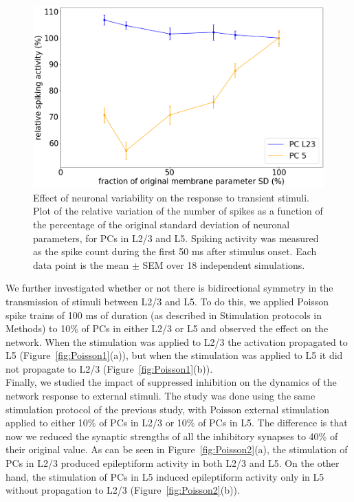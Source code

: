 \begin{figure}[H]
    \centering
    \includegraphics[scale=0.25]{Variab5.png}
    \caption{Effect of neuronal variability on the response to transient stimuli. Plot of the relative variation of the number of spikes as a function of the percentage of the original standard deviation of neuronal parameters, for PCs in L2/3 and L5. Spiking activity was measured as the spike count during the first 50 ms after stimulus onset. Each data point is the mean $\pm$ SEM over 18 independent simulations.}
    \label{fig:variab}
\end{figure}

We further investigated whether or not there is bidirectional symmetry in the transmission of stimuli between L2/3 and L5. To do this, we applied Poisson spike trains of 100 ms of duration (as described in Stimulation protocols in Methods) to 10\% of PCs in either L2/3 or L5 and observed the effect on the network. When the stimulation was applied to L2/3 the activation propagated to L5 (Figure~\ref{fig:Poisson1}(a)), but when the stimulation was applied to L5 it did not propagate to L2/3 (Figure~\ref{fig:Poisson1}(b)).\\  

Finally, we studied the impact of suppressed inhibition on the dynamics of the network response to external stimuli. The study was done using the same stimulation protocol of the previous study, with Poisson external stimulation applied to either 10\% of PCs in L2/3 or 10\% of PCs in L5. The difference is that now we reduced the synaptic strengths of all the inhibitory synapses to 40\% of their original value. As can be seen in Figure~\ref{fig:Poisson2}(a), the stimulation of PCs in L2/3 produced epileptiform activity in both L2/3 and L5. On the other hand, the stimulation of PCs in L5 induced epileptiform activity only in L5 without propagation to L2/3 (Figure~\ref{fig:Poisson2}(b)).


